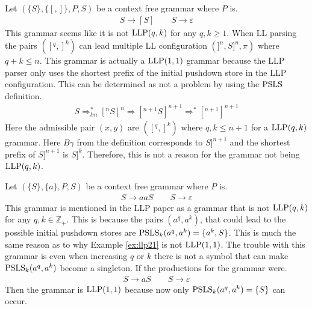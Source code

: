 \begin{example}
    Let $(\{S\}, \{[, ]\}, P, S)$ be a context free grammar where $P$ is.
    \begin{gather*}
        S \to [S] \qquad S \to \varepsilon
    \end{gather*}
    This grammar seems like it is not $\text{LLP}(q, k)$ for any $q, k \geq 1$. When LL parsing the pairs $([^q, ]^k)$ can lead multiple LL configuration $(]^n, S]^n, \pi)$ where $q + k \leq n$. This grammar is actually a $\text{LLP}(1,1)$ grammar because the LLP parser only uses the shortest prefix of the initial pushdown store in the LLP configuration. This can be determined as not a problem by using the $\text{PSLS}$ definition.
    \begin{align*}
        S \Rightarrow_{lm}^* [^nS]^n \Rightarrow [^{n + 1}S]^{n + 1} \Rightarrow^* [^{n + 1}]^{n + 1}
    \end{align*}
    Here the admissible pair $(x, y)$ are $([^q, ]^k)$ where $q, k \leq n + 1$ for a $\text{LLP}(q, k)$ grammar. Here $B\gamma$ from the definition corresponds to $S]^{n+1}$ and the shortest prefix of $S]^{n+1}$ is $S]^k$. Therefore, this is not a reason for the grammar not being $\text{LLP}(q,k)$.
\end{example}

\begin{example}
    Let $(\{S\}, \{a\}, P, S)$ be a context free grammar where $P$ is.
    \begin{gather*}
        S \to aaS \qquad S \to \varepsilon
    \end{gather*}
    This grammar is mentioned in the LLP paper \cite[16]{Vagner2007} as a grammar that is not $\text{LLP}(q,k)$ for any $q, k \in \mathbb{Z}_+$. This is because the pairs $(a^q, a^k)$, that could lead to the possible initial pushdown stores are $\text{PSLS}_k(a^q, a^k) = \{a^k, S\}$. This is much the same reason as to why Example \ref{ex:llp21} is not $\text{LLP}(1, 1)$. The trouble with this grammar is even when increasing $q$ or $k$ there is not a symbol that can make $\text{PSLS}_k(a^q, a^k)$ become a singleton. If the productions for the grammar were.
    \begin{gather*}
        S \to aS \qquad S \to \varepsilon
    \end{gather*}
    Then the grammar is $\text{LLP}(1, 1)$ because now only $\text{PSLS}_k(a^q, a^k) = \{S\}$ can occur.
\end{example}